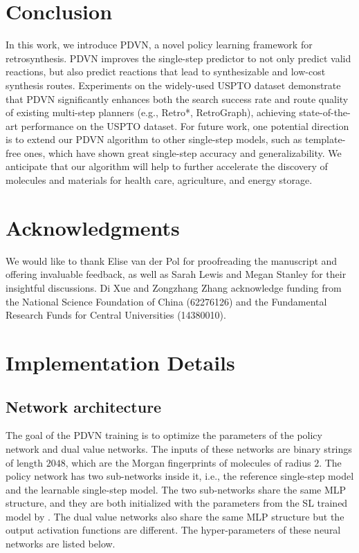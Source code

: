 \documentclass[nohyperref]{article}
\theoremstyle{plain}
\theoremstyle{definition}
\theoremstyle{remark}
\begin{document}
\section{Conclusion}

In this work, we introduce PDVN, a novel policy learning framework for retrosynthesis. 
PDVN improves the single-step predictor to not only predict valid reactions, but also predict reactions that lead to synthesizable and low-cost synthesis routes.
Experiments on the widely-used USPTO dataset demonstrate that PDVN significantly enhances both the search success rate and route quality of existing multi-step planners (e.g., Retro*, RetroGraph), achieving state-of-the-art performance on the USPTO dataset.  
For future work, one potential direction is to extend our PDVN algorithm to other single-step models, such as template-free ones, which have shown great single-step accuracy and generalizability.
We anticipate that our algorithm will help to further accelerate the discovery of molecules and materials for health care, agriculture, and energy storage.

\section{Acknowledgments}
We would like to thank Elise van der Pol for proofreading the manuscript and offering invaluable feedback, as well as Sarah Lewis and Megan Stanley for their insightful discussions. 
Di Xue and Zongzhang Zhang acknowledge funding from the National Science Foundation of China (62276126) and the Fundamental Research Funds for Central Universities (14380010).




\nocite{langley00}





\newpage
\appendix
\onecolumn




\section{Implementation Details}

\subsection{Network architecture}

The goal of the PDVN training is to optimize the parameters of the policy network and dual value networks. 
The inputs of these networks are binary strings of length $2048$, which are the Morgan fingerprints of molecules of radius $2$.
The policy network has two sub-networks inside it, i.e., the reference single-step model and the learnable single-step model. The two sub-networks share the same MLP structure, and they are both initialized with the parameters from the SL trained model by \cite{chen20retrostar}. The dual value networks also share the same MLP structure but the output activation functions are different. The hyper-parameters of these neural networks are listed below.
\end{document}
